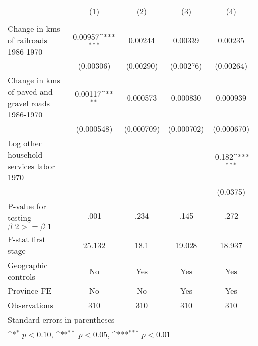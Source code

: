 {
\def\sym#1{\ifmmode^{#1}\else\(^{#1}\)\fi}
\begin{tabular}{l*{4}{c}}
\hline\hline
                &\multicolumn{1}{c}{(1)}&\multicolumn{1}{c}{(2)}&\multicolumn{1}{c}{(3)}&\multicolumn{1}{c}{(4)}\\
                &\multicolumn{1}{c}{}&\multicolumn{1}{c}{}&\multicolumn{1}{c}{}&\multicolumn{1}{c}{}\\
\hline
Change in kms of railroads 1986-1970&  0.00957\sym{***}&  0.00244         &  0.00339         &  0.00235         \\
                &(0.00306)         &(0.00290)         &(0.00276)         &(0.00264)         \\
[1em]
Change in kms of paved and gravel roads 1986-1970&  0.00117\sym{**} & 0.000573         & 0.000830         & 0.000939         \\
                &(0.000548)         &(0.000709)         &(0.000702)         &(0.000670)         \\
[1em]
Log other household services labor 1970&                  &                  &                  &   -0.182\sym{***}\\
                &                  &                  &                  & (0.0375)         \\
\hline
P-value for testing $\beta\_{2} >= \beta\_{1}$&     .001         &     .234         &     .145         &     .272         \\
F-stat first stage&   25.132         &     18.1         &   19.028         &   18.937         \\
Geographic controls&       No         &      Yes         &      Yes         &      Yes         \\
Province FE     &       No         &       No         &      Yes         &      Yes         \\
Observations    &      310         &      310         &      310         &      310         \\
\hline\hline
\multicolumn{5}{l}{\footnotesize Standard errors in parentheses}\\
\multicolumn{5}{l}{\footnotesize \sym{*} \(p<0.10\), \sym{**} \(p<0.05\), \sym{***} \(p<0.01\)}\\
\end{tabular}
}
